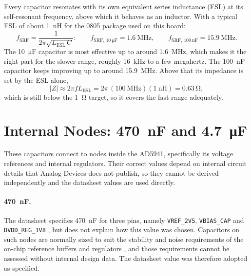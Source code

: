 Every capacitor resonates with its own equivalent series inductance (ESL) at
its self-resonant frequency, above which it behaves as an inductor. With a
typical ESL of about \SI{1}{\nano\henry} for the 0805 package used on this
board:
\begin{equation}
  f_\text{SRF} = \frac{1}{2\pi\sqrt{L_\text{ESL}\,C}}:
  \qquad
  f_{\text{SRF},\,\SI{10}{\micro\farad}} = \SI{1.6}{\mega\hertz},
  \qquad
  f_{\text{SRF},\,\SI{100}{\nano\farad}} = \SI{15.9}{\mega\hertz}.
  \label{eq:hw_srf}
\end{equation}
The \SI{10}{\micro\farad} capacitor is most effective up to around
\SI{1.6}{\mega\hertz}, which makes it the right part for the slower range,
roughly \SI{16}{\kilo\hertz} to a few megahertz. The \SI{100}{\nano\farad}
capacitor keeps improving up to around \SI{15.9}{\mega\hertz}. Above that its
impedance is set by the ESL alone,
\begin{equation}
  |Z| \approx 2\pi f L_\text{ESL}
      = 2\pi\,(\SI{100}{\mega\hertz})(\SI{1}{\nano\henry})
      = \SI{0.63}{\ohm},
  \label{eq:hw_esl_100mhz}
\end{equation}
which is still below the \SI{1}{\ohm} target, so it covers the fast range
adequately.
 
\section{Internal Nodes: \SI{470}{\nano\farad} and \SI{4.7}{\micro\farad}}
\label{sec:hw_internal_nodes}
 
These capacitors connect to nodes inside the AD5941, specifically its voltage
references and internal regulators. Their correct values depend on internal
circuit details that Analog Devices does not publish, so they cannot be
derived independently and the datasheet values are used directly.
 
\paragraph{\SI{470}{\nano\farad}.}
The datasheet specifies \SI{470}{\nano\farad} for three pins, namely
\texttt{VREF\_2V5}, \texttt{VBIAS\_CAP} and \texttt{DVDD\_REG\_1V8}
\cite[pp.~11, 20--21]{ad5941_ds}, but does not explain how this value was
chosen. Capacitors on such nodes are normally sized to suit the stability and
noise requirements of the on-chip reference buffers and regulators
\cite{rinconmora2009ldo}, and those requirements cannot be assessed without
internal design data. The datasheet value was therefore adopted as specified.
 
